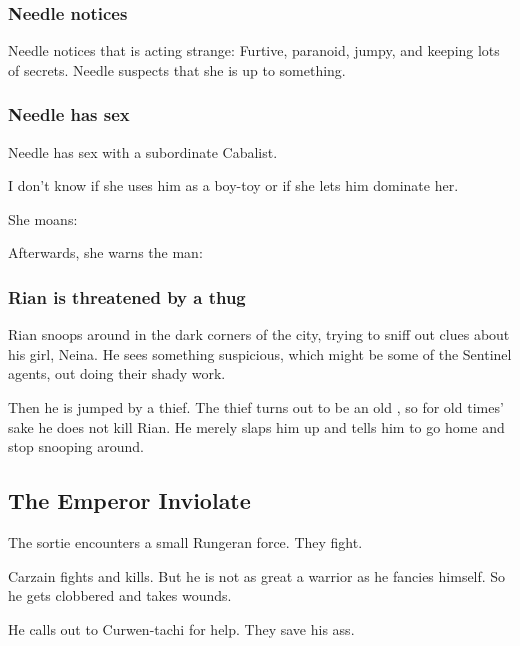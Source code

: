 \begin{garbage}
\subsubsection{Needle notices \Tiroco}
Needle notices that \Tiroco{} is acting strange: 
Furtive, paranoid, jumpy, and keeping lots of secrets. 
Needle suspects that she is up to something. 





\subsubsection{Needle has sex}
Needle has sex with a subordinate Cabalist. 

I don't know if she uses him as a boy-toy or if she lets him dominate her. 

She moans: 

Afterwards, she warns the man: 





\subsubsection{Rian is threatened by a thug}
Rian snoops around in the dark corners of the city, trying to sniff out clues about his girl, Neina. 
He sees something suspicious, 
which might be some of the Sentinel agents, out doing their shady work. 

Then he is jumped by a thief. The thief turns out to be an old , so for old times' sake he does not kill Rian. He merely slaps him up and tells him to go home and stop snooping around. 









\subsection{The Emperor Inviolate}
The sortie encounters a small Rungeran force. They fight. 

Carzain fights and kills. 
But he is not as great a warrior as he fancies himself. 
So he gets clobbered and takes wounds. 

He calls out to Curwen-tachi for help. 
They save his ass. 


\end{garbage}
